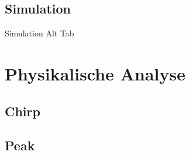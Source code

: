 \documentclass[11pt]{beamer}
\begin{document}
\subsection{Simulation}
\begin{frame}{Simulation}
\center
Alt Tab
\end{frame}
\section{Physikalische Analyse}
\begin{frame}

\end{frame}
\subsection{Chirp}
\begin{frame}

\end{frame}
\subsection{Peak}
\begin{frame}

\end{frame}
\end{document}
